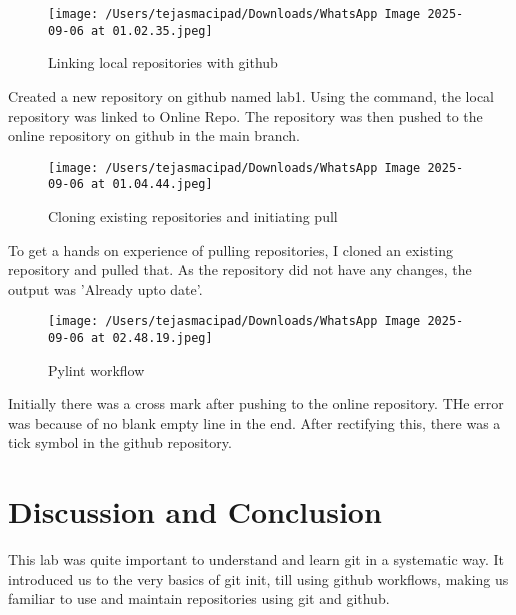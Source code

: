 \documentclass[12pt, a4paper]{report}
\begin{document}
\begin{figure}[!h]
    \centering
    \texttt{[image: /Users/tejasmacipad/Downloads/WhatsApp Image 2025-09-06 at 01.02.35.jpeg]}
    \caption{Linking local repositories with github}
    \label{fig:lab4}
\end{figure}

Created a new repository on github named lab1. Using the command, the local repository was linked to Online Repo.
The repository was then pushed to the online repository on github in the main branch.

\begin{figure}[!h]
    \centering
    \texttt{[image: /Users/tejasmacipad/Downloads/WhatsApp Image 2025-09-06 at 01.04.44.jpeg]}
    \caption{Cloning existing repositories and initiating pull}
    \label{fig:lab5}
\end{figure}

To get a hands on experience of pulling repositories, I cloned an existing repository and pulled that. As the repository did not have any changes, the output was 'Already upto date'.

\newpage

\begin{figure}[!h]
    \centering
    \texttt{[image: /Users/tejasmacipad/Downloads/WhatsApp Image 2025-09-06 at 02.48.19.jpeg]}
    \caption{Pylint workflow}
    \label{fig:lab6}
\end{figure}

Initially there was a cross mark after pushing to the online repository. THe error was because of no blank empty line in the end.
\newline
After rectifying this, there was a tick symbol in the github repository.

\section{Discussion and Conclusion}
This lab was quite important to understand and learn git in a systematic way. It introduced us to the very basics of git init, till using github workflows, making us familiar to use and maintain repositories using git and github.
\end{document}

